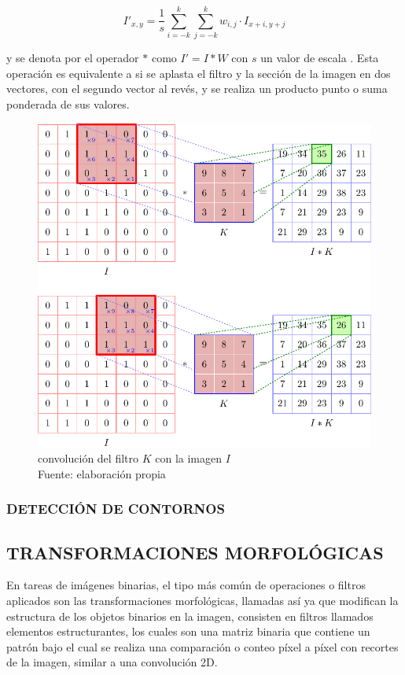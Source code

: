         \begin{equation}
            I'_{x,y} = \frac{1}{s} \sum_{i=-k}^{k} \sum_{j=-k}^{k} w_{i, j}\cdot I_{x+i, y+j}
        \end{equation}
        
        y se denota por el operador $*$ como $I' = I*W$ con $s$ un valor de escala \citep{10.5555/2584519}. Esta operación es equivalente a si se aplasta el filtro y la sección de la imagen en dos vectores, con el segundo vector al revés, y se realiza un producto punto o suma ponderada de sus valores.
        
        \begin{figure}[H]
        	\centering
        	\includegraphics[scale=0.82]{imagenes/conv1}
        	\caption[Convolución del filtro $K$ con la imagen $I$]{convolución del filtro $K$ con la imagen $I$\\Fuente: elaboración propia}
        \end{figure}
    
    	\subsubsection{DETECCIÓN DE CONTORNOS}
    		
        
        \subsection{TRANSFORMACIONES MORFOLÓGICAS}
        	En tareas de imágenes binarias, el tipo más común de operaciones o filtros aplicados son las transformaciones morfológicas, llamadas así ya que modifican la estructura de los objetos binarios en la imagen, consisten en filtros llamados elementos estructurantes, los cuales son una matriz binaria que contiene un patrón bajo el cual se realiza una comparación o conteo píxel a píxel con recortes de la imagen, similar a una convolución 2D. \citep{szeliski}
